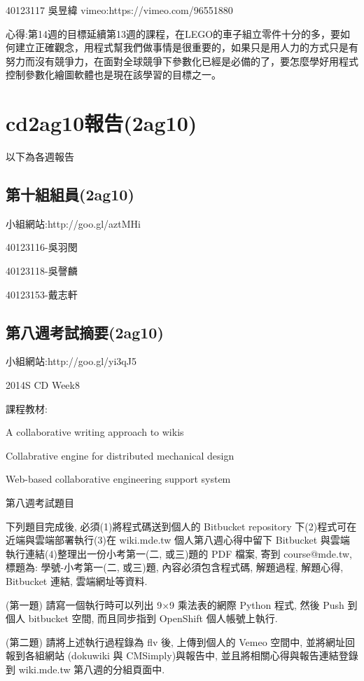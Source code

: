 \documentclass[]{article}
\begin{document}
40123117 吳昱緯 vimeo:https://vimeo.com/96551880

心得:第14週的目標延續第13週的課程，在LEGO的車子組立零件十分的多，要如何建立正確觀念，用程式幫我們做事情是很重要的，如果只是用人力的方式只是有努力而沒有競爭力，在面對全球競爭下參數化已經是必備的了，要怎麼學好用程式控制參數化繪圖軟體也是現在該學習的目標之一。

\section{cd2ag10報告(2ag10)}\label{cd2ag10ux5831ux544a2ag10}

以下為各週報告

\subsection{第十組組員(2ag10)}\label{ux7b2cux5341ux7d44ux7d44ux54e12ag10}

小組網站:http://goo.gl/aztMHi

40123116-吳羽閔

40123118-吳謦麟

40123153-戴志軒

\subsection{第八週考試摘要(2ag10)}\label{ux7b2cux516bux9031ux8003ux8a66ux6458ux89812ag10}

小組網站:http://goo.gl/yi3qJ5

2014S CD Week8

課程教材:

A collaborative writing approach to wikis

Collabrative engine for distributed mechanical design

Web-based collaborative engineering support system

第八週考試題目

下列題目完成後, 必須(1)將程式碼送到個人的 Bitbucket repository
下(2)程式可在近端與雲端部署執行(3)在 wiki.mde.tw 個人第八週心得中留下
Bitbucket 與雲端執行連結(4)整理出一份小考第一(二, 或三)題的 PDF 檔案,
寄到 course@mde.tw, 標題為: 學號-小考第一(二, 或三)題,
內容必須包含程式碼, 解題過程, 解題心得, Bitbucket 連結, 雲端網址等資料.

(第一題) 請寫一個執行時可以列出 9×9 乘法表的網際 Python 程式, 然後 Push
到個人 bitbucket 空間, 而且同步指到 OpenShift 個人帳號上執行.

(第二題) 請將上述執行過程錄為 flv 後, 上傳到個人的 Vemeo 空間中,
並將網址回報到各組網站 (dokuwiki 與 CMSimply)與報告中,
並且將相關心得與報告連結登錄到 wiki.mde.tw 第八週的分組頁面中.
\end{document}
